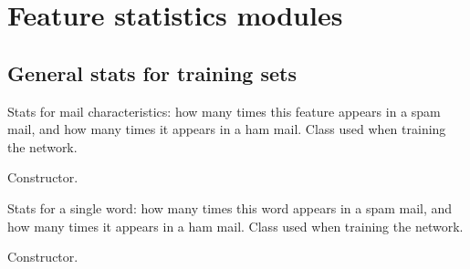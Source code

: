 \documentclass[letterpaper,10pt,english]{sphinxmanual}
\begin{document}
\chapter{Feature statistics modules}
\label{index:feature-statistics-modules}

\section{General stats for training sets}
\label{index:general-stats-for-training-sets}\label{index:module-gen_stat}

\begin{fulllineitems}
\label{index:gen_stat.Stat}
Stats for mail characteristics: how many times this feature appears in
a spam mail, and how many times it appears in a ham mail. Class used when
training the network.

\begin{fulllineitems}
\label{index:gen_stat.Stat.__init__}
Constructor.

\end{fulllineitems}


\end{fulllineitems}


\begin{fulllineitems}
\label{index:gen_stat.Word}
Stats for a single word: how many times this word appears in a spam
mail, and how many times it appears in a ham mail. Class used when
training the network.

\begin{fulllineitems}
\label{index:gen_stat.Word.__init__}
Constructor.

\end{fulllineitems}


\end{fulllineitems}
\end{document}
